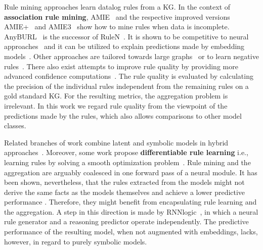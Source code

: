 \documentclass{article}
\theoremstyle{plain}
\theoremstyle{remark}
\begin{document}
Rule mining approaches learn datalog rules from a KG. In the context of \textbf{association rule mining}, AMIE~\cite{amie2013} and the respective improved versions AMIE+~\cite{amieplus2015} and AMIE3~\cite{lajus2020fast} show how to mine rules when data is incomplete. AnyBURL~\cite{meilicke2019anyburl} is the successor of RuleN~\cite{rulen2018}. It is shown to be competitive to neural approaches~\cite{rossi2020knowledge,meilicke2023largeAnyburl} and it can be utilized to explain predictions made by embedding models~\cite{betz2022adversarial}. Other approaches are tailored towards large graphs~\cite{fan2022discovering,ChenWG16} or to learn negative rules~\cite{OrtonaMP18}.
There also exist attempts to improve rule quality by providing more advanced confidence computations~\cite{amie2013,pellissier2017completeness,zupanc2018estimating}. The rule quality is evaluated by calculating the precision of the individual rules independent from the remaining rules on a gold standard KG. For the resulting metrics, the aggregation problem is irrelevant. In this work we regard rule quality from the viewpoint of the predictions made by the rules, which also allows comparisons to other model classes. 

Related branches of work combine latent and symbolic models in hybrid approaches~\cite{guo2016jointly,guo2018knowledge,DBLP:conf/uai/Garcia-DuranN18,wu2022learning,meilicke2021naive}. Moreover, some work propose \textbf{differentiable rule learning} i.e., learning rules by solving a smooth optimization problem~\cite{yang2017differentiable,sadeghian2019drum}. Rule mining and the aggregation are arguably coalesced in one forward pass of a neural module. It has been shown, nevertheless, that the rules extracted from the models might not derive the same facts as the models themselves and achieve a lower predictive performance \cite{faithful22Cucala}. Therefore, they might benefit from encapsulating rule learning and the aggregation. A step in this direction is made by RNNlogic~\cite{qu2020rnnlogic}, in which a neural rule generator and a reasoning predictor operate independently. The predictive performance of the resulting model, when not augmented with embeddings, lacks, however, in regard to purely symbolic models.
\end{document}
